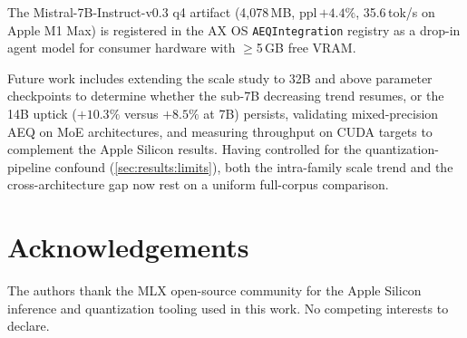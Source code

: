 \documentclass[10pt,twocolumn]{article}
\begin{document}
The Mistral-7B-Instruct-v0.3 q4 artifact (4,078\,MB, ppl\,$+4.4\%$,
35.6\,tok/s on Apple M1 Max) is registered in the AX OS \texttt{AEQIntegration}
registry as a drop-in agent model for consumer hardware with $\geq$5\,GB free VRAM.

Future work includes extending the scale study to 32B and above parameter
checkpoints to determine whether the sub-7B decreasing trend resumes, or the 14B
uptick ($+10.3\%$ versus $+8.5\%$ at 7B) persists,
validating mixed-precision AEQ on MoE architectures, and measuring throughput on
CUDA targets to complement the Apple Silicon results.  Having controlled for the
quantization-pipeline confound (\cref{sec:results:limits}), both the
intra-family scale trend and the cross-architecture gap now rest on a
uniform full-corpus comparison.

\clearpage
\section*{Acknowledgements}
The authors thank the MLX open-source community for the Apple Silicon
inference and quantization tooling used in this work.
No competing interests to declare.



\end{document}
